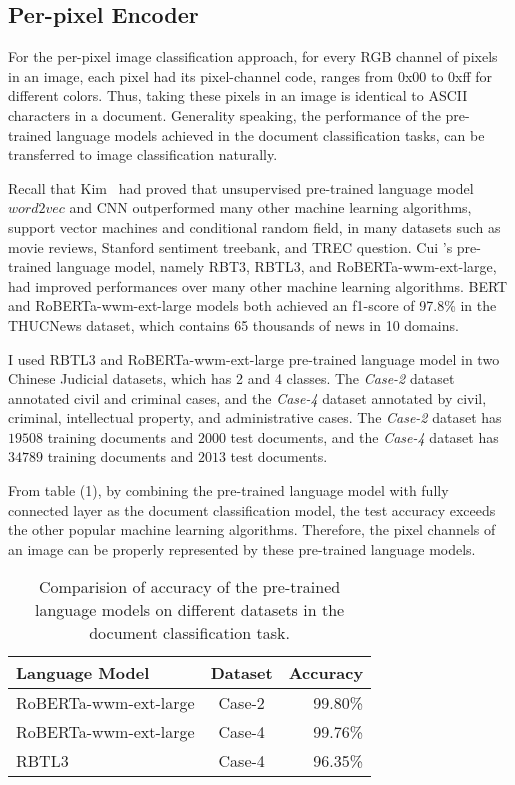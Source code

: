 \documentclass[review]{cvpr}
\begin{document}
\subsection{Per-pixel Encoder}

For the per-pixel image classification approach, for every RGB channel of pixels in an image,
each pixel had its pixel-channel code, ranges from 0x00 to 0xff for different colors.
Thus, taking these pixels in an image is identical to ASCII characters in a document.
Generality speaking, the performance of the pre-trained language models achieved in the document classification tasks, can be transferred to image classification naturally.

\par Recall that Kim~\cite{kim2014convolutional} had proved that unsupervised pre-trained language model $word2vec$ and CNN outperformed many other machine learning algorithms,
\eg support vector machines and conditional random field, in many datasets such as movie reviews, Stanford sentiment treebank, and TREC question.
Cui \etal's pre-trained language model, namely RBT3, RBTL3, and RoBERTa-wwm-ext-large, had improved performances over many other machine learning algorithms.
BERT and RoBERTa-wwm-ext-large models both achieved an f1-score of 97.8\% in the THUCNews dataset, which contains 65 thousands of news in 10 domains.

\par I used RBTL3 and RoBERTa-wwm-ext-large pre-trained language model in two Chinese Judicial datasets, which has 2 and 4 classes.
The \textit{Case-2} dataset annotated civil and criminal cases, and the \textit{Case-4} dataset annotated by civil, criminal, intellectual property, and administrative cases.
The \textit{Case-2} dataset has $19508$ training documents and $2000$ test documents, and the \textit{Case-4} dataset has $34789$ training documents and $2013$ test documents.

\par From table (1), by combining the pre-trained language model with fully connected layer as the document classification model,
the test accuracy exceeds the other popular machine learning algorithms.
Therefore, the pixel channels of an image can be properly represented by these pre-trained language models.

\begin{table}
\begin{center}
\begin{tabular}{|l|c|r|}
\hline
Language Model 	& Dataset & Accuracy \\
\hline\hline
RoBERTa-wwm-ext-large & Case-2	&	99.80\% \\
RoBERTa-wwm-ext-large & Case-4	&	99.76\% \\
RBTL3  & Case-4	&	96.35\% \\
\hline
\end{tabular}
\end{center}
\caption{Comparision of accuracy of the pre-trained language models on different datasets in the document classification task.}
\end{table}
\end{document}
